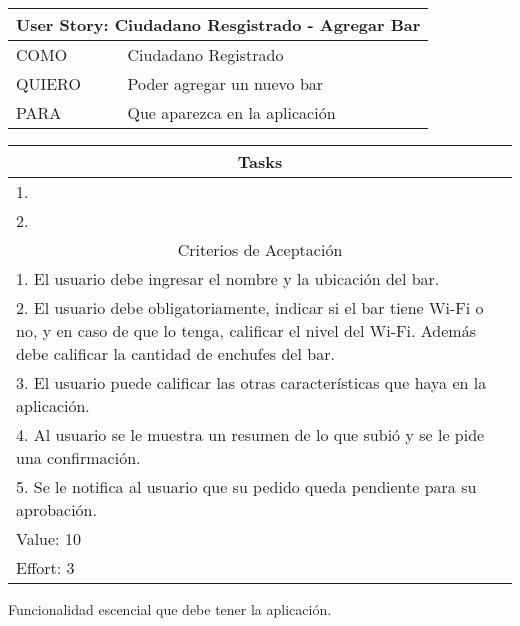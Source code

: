     \begin{table}[H]
        \centering
        \begin{tabular}{| p{1.5cm}| p{10.2cm} |}
            \hline
            \multicolumn{2}{|c|}{User Story: Ciudadano Resgistrado - Agregar Bar} \\
            \hline
            COMO & Ciudadano Registrado \\ \hline
            QUIERO & Poder agregar un nuevo bar \\ \hline
            PARA & Que aparezca en la aplicación \\ \hline
            \hline
        \end{tabular}
        \begin{tabular}{| p{12.118cm} |}
            \multicolumn{1}{|c|}{Tasks} \\
            \hline
            1. \\ \hline
            2. \\ \hline
            \hline
            \multicolumn{1}{|c|}{Criterios de Aceptación} \\
            \hline
            1. El usuario debe ingresar el nombre y la ubicación del bar. \\ \hline
            2. El usuario debe obligatoriamente, indicar si el bar tiene Wi-Fi o no, y en caso de que lo tenga, calificar el nivel del Wi-Fi. Además debe calificar la cantidad de enchufes del bar. \\ \hline
            3. El usuario puede calificar las otras características que haya en la aplicación. \\ \hline
            4. Al usuario se le muestra un resumen de lo que subió y se le pide una confirmación. \\ \hline
            5. Se le notifica al usuario que su pedido queda pendiente para su aprobación. \\ \hline
            Value: 10 \\ \hline
            Effort: 3 \\ \hline
        \end{tabular}
    \end{table}
    
     Funcionalidad escencial que debe tener la aplicación. \\
    
